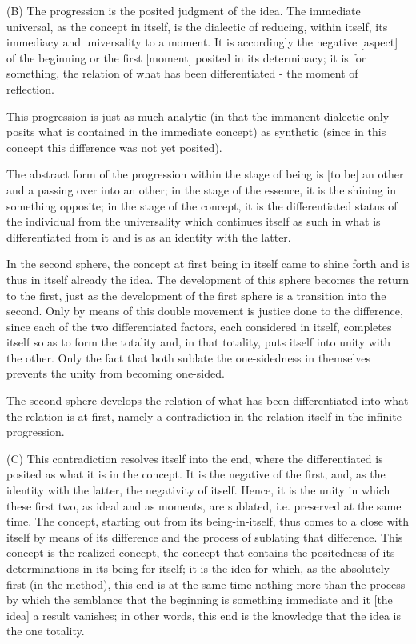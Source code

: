 (B) The progression is the posited judgment of the idea.
The immediate universal, as the concept in itself, is
the dialectic of reducing, within itself,
its immediacy and universality to a moment.
It is accordingly the negative [aspect] of the beginning or
the first [moment] posited in its determinacy;
it is for something, the relation of what has been differentiated
- the moment of reflection.

    This progression is just
    as much analytic
    (in that the immanent dialectic only posits
    what is contained in the immediate concept)
    as synthetic
    (since in this concept this difference was not yet posited).

The abstract form of the progression within the stage of being is
[to be] an other and a passing over into an other;
in the stage of the essence, it is the shining in something opposite;
in the stage of the concept, it is the differentiated status
of the individual from the universality which continues itself as such
in what is differentiated from it and is as an identity with the latter.

In the second sphere, the concept at first being in itself came
to shine forth and is thus in itself already the idea.
The development of this sphere becomes the return to the first,
just as the development of the first sphere is a transition into the second.
Only by means of this double movement is justice done to the difference,
since each of the two differentiated factors, each considered in itself,
completes itself so as to form the totality and, in that totality,
puts itself into unity with the other.
Only the fact that both sublate the one-sidedness
in themselves prevents the unity from becoming one-sided.

The second sphere develops the relation of what has been differentiated
into what the relation is at first, namely a contradiction in the relation itself
in the infinite progression.

(C) This contradiction resolves itself into the end,
where the differentiated is posited as what it is in the concept.
It is the negative of the first, and, as the identity with the latter,
the negativity of itself.
Hence, it is the unity in which these first two, as ideal and as moments,
are sublated, i.e. preserved at the same time.
The concept, starting out from its being-in-itself, thus comes to a close
with itself by means of its difference and the process of sublating that difference.
This concept is the realized concept,
the concept that contains the positedness
of its determinations in its being-for-itself;
it is the idea for which, as the absolutely first (in the method),
this end is at the same time nothing more than the process by which
the semblance that the beginning is something immediate and
it [the idea] a result vanishes;
in other words, this end is the knowledge that the idea is the one totality.


